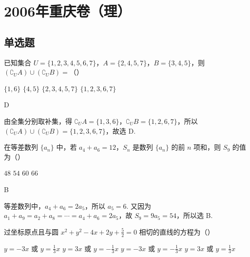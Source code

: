 
\chapter{2006年重庆卷（理）}
\section{单选题}
\begin{problem}
已知集合 \(U = \{1, 2, 3, 4, 5, 6, 7\}\)，\(A = \{2, 4, 5, 7\}\)，\(B = \{3, 4, 5\}\)，则 \(\left(\complement_U A\right) \cup \left(\complement_U B\right) =\)（\quad）

\choices
    {\(\{1,6\}\)}
    {\(\{4,5\}\)}
    {\(\{2,3,4,5,7\}\)}
    {\(\{1,2,3,6,7\}\)}
\end{problem}

\begin{answer}
D
\end{answer}

\begin{solution}
由全集分别取补集，得 \(\complement_U A=\{1,3,6\}\)，\(\complement_U B=\{1,2,6,7\}\)，所以 \(\left(\complement_U A\right)\cup\left(\complement_U B\right)=\{1,2,3,6,7\}\)，故选 D.
\end{solution}

\begin{problem}
在等差数列 \(\{a_{n}\}\) 中，若 \(a_{4} + a_{6} = 12\)，\(S_{n}\) 是数列 \(\{a_{n}\}\) 的前 \(n\) 项和，则 \(S_{9}\) 的值为（\quad）

\choices
    {\(48\)}
    {\(54\)}
    {\(60\)}
    {\(66\)}
\end{problem}

\begin{answer}
B
\end{answer}

\begin{solution}
等差数列中，\(a_{4}+a_{6}=2a_{5}\)，所以 \(a_{5}=6\). 又因为 \(a_{1}+a_{9}=a_{2}+a_{8}=\cdots=a_{4}+a_{6}=2a_{5}\)，故 \(S_{9}=9a_{5}=54\)，所以选 B.
\end{solution}

\begin{problem}
过坐标原点且与圆 \(x^{2} + y^{2} - 4x + 2y + \frac{5}{2} = 0\) 相切的直线的方程为（\quad）

\choices
    {\(y = -3x\) 或 \(y = \frac{1}{3} x\)}
    {\(y = 3x\) 或 \(y = -\frac{1}{3} x\)}
    {\(y = -3x\) 或 \(y = -\frac{1}{3} x\)}
    {\(y = 3x\) 或 \(y = \frac{1}{3} x\)}
\end{problem}

